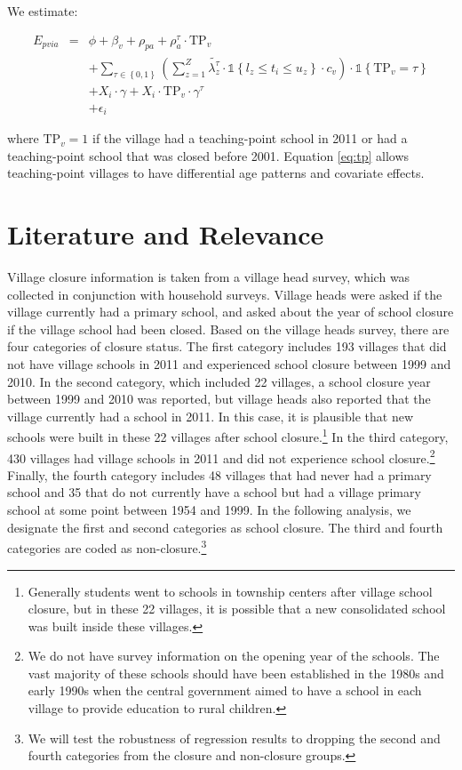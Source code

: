 \documentclass[12pt,english]{article}
\begin{document}
We estimate:
\begin{singlespace}\vspace*{-\baselineskip}
	\begin{eqnarray}
	\label{eq:tp}
	E_{pvia} & = & \phi + \beta_{v}  + \rho_{pa} + \rho^{\tau}_{a} \cdot \text{TP}_{v}
	\nonumber \\
	&  & + \sum_{\tau \in \left\{0, 1\right\}}
	\left(
	\sum_{z=1}^Z \tilde{\lambda^{\tau}_{z}} \cdot \mathbb{1} \left\{ l_{z}\leq t_{i}\leq u_{z} \right\}
	\cdot c_{v}
	\right)
	\cdot \mathbb{1} \left\{ \text{TP}_{v} = \tau \right\}
	\\
	&  &
	+ X_i \cdot \gamma + X_i \cdot \text{TP}_{v} \cdot \gamma^{\tau} \nonumber\\
	&  & + \epsilon_{i}  \nonumber
	\end{eqnarray}
\end{singlespace}\noindent\ignorespaces
where $\text{TP}_v = 1$ if the village had a teaching-point school in 2011 or had a teaching-point school that was closed before 2001. Equation \ref{eq:tp} allows teaching-point villages to have differential age patterns and covariate effects.


\section{Literature and Relevance}

Village closure information is taken from a village head survey, which was collected in conjunction with household surveys. Village heads were asked if the village currently had a primary school, and asked about the year of school closure if the village school had been closed. Based on the village heads survey, there are four categories of closure status. The first category includes 193 villages that did not have village schools in 2011 and experienced school closure between 1999 and 2010. In the second category, which included 22 villages, a school closure year between 1999 and 2010 was reported, but village heads also reported that the village currently had a school in 2011. In this case, it is plausible that new schools were built in these 22 villages after school closure.\footnote{Generally students went to schools in township centers after village school closure, but in these 22 villages, it is possible that a new consolidated school was built inside these villages.} In the third category, 430 villages had village schools in 2011 and did not experience school closure.\footnote{We do not have survey information on the opening year of the schools. The vast majority of these schools should have been established in the 1980s and early 1990s when the central government aimed to have a school in each village to provide education to rural children.} Finally, the fourth category includes 48 villages that had never had a primary school and 35 that do not currently have a school but had a village primary school at some point between 1954 and 1999. In the following analysis, we designate the first and second categories as school closure. The third and fourth categories are coded as non-closure.\footnote{We will test the robustness of regression results to dropping the second and fourth categories from the closure and non-closure groups.}
\end{document}
